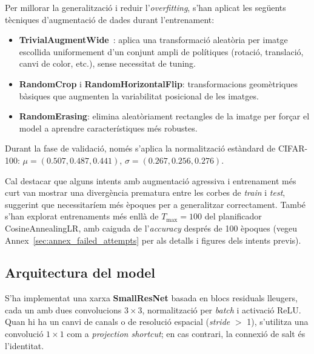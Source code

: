 \documentclass[9pt,a4paper,twoside]{tau-class/tau}
\begin{document}
        Per millorar la generalització i reduir l'\textit{overfitting}, s'han aplicat les següents tècniques
        d'augmentació de dades durant l'entrenament:
        
        \begin{itemize}
            \item \textbf{TrivialAugmentWide}~\cite{muller2021trivialaugment}: aplica una transformació
                  aleatòria per imatge escollida uniformement d'un conjunt ampli de polítiques
                  (rotació, translació, canvi de color, etc.), sense necessitat de tuning.
            \item \textbf{RandomCrop} i \textbf{RandomHorizontalFlip}: transformacions geomètriques bàsiques
                  que augmenten la variabilitat posicional de les imatges.
            \item \textbf{RandomErasing}: elimina aleatòriament rectangles de la imatge per forçar
                  el model a aprendre característiques més robustes.
        \end{itemize}
        
        Durant la fase de validació, només s'aplica la normalització estàndard de CIFAR-100:
        $\mu = (0.507, 0.487, 0.441)$, $\sigma = (0.267, 0.256, 0.276)$.
        
        Cal destacar que alguns intents amb augmentació agressiva i entrenament més curt van mostrar
        una divergència prematura entre les corbes de \textit{train} i \textit{test}, suggerint que
        necessitaríem més èpoques per a generalitzar correctament. També s'han explorat entrenaments
        més enllà de $T_{\max}=100$ del planificador CosineAnnealingLR, amb caiguda de l'\textit{accuracy}
        després de 100 èpoques (vegeu Annex~\ref{sec:annex_failed_attempts} per als detalls i figures dels intents previs).
        

    \subsection{Arquitectura del model}

        S'ha implementat una xarxa \textbf{SmallResNet} basada en blocs residuals lleugers,
        cada un amb dues convolucions $3{\times}3$, normalització per \textit{batch} i activació ReLU.
        Quan hi ha un canvi de canals o de resolució espacial (\textit{stride} $>$ 1), s'utilitza una
        convolució $1{\times}1$ com a \textit{projection shortcut}; en cas contrari, la connexió de
        salt és l'identitat.
        
\end{document}
